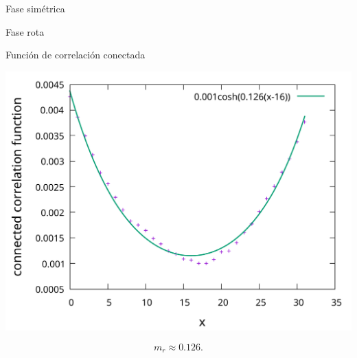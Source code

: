 \documentclass[11pt]{beamer}
\begin{document}
\begin{frame}{Fase simétrica}
\end{frame}

\begin{frame}{Fase rota}
\end{frame}

\begin{frame}{Función de correlación conectada}
\begin{center}
\includegraphics[scale=0.3]{figures/correlation_function.pdf}
\end{center}

$$ m_r \approx 0.126. $$
\end{frame}
\end{document}
